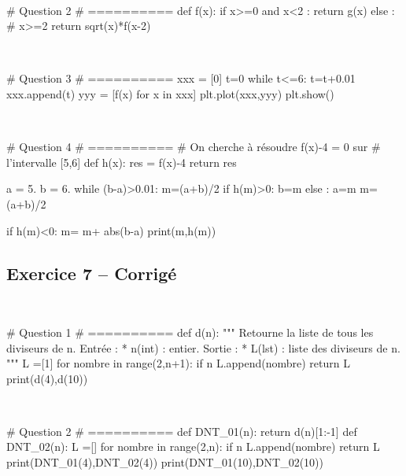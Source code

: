 \documentclass[10pt,fleqn]{article} %
\begin{document}
\begin{multicols}{2}
\begin{corrige}
$\quad$
\begin{python}
# Question 2
# ==========
def f(x):
    if x>=0 and x<2 :
        return g(x)
    else : # x>=2
        return sqrt(x)*f(x-2)
\end{python}
\end{corrige}

\begin{corrige}
$\quad$
\begin{python}
# Question 3
# ==========
xxx = [0]
t=0
while t<=6:
    t=t+0.01
    xxx.append(t)
yyy = [f(x) for x in xxx]
plt.plot(xxx,yyy)
plt.show()
\end{python}
\end{corrige}

\begin{corrige}
$\quad$
\begin{python}
# Question 4
# ==========
# On cherche à résoudre f(x)-4 = 0 sur
# l'intervalle [5,6]
def h(x):
    res = f(x)-4
    return res

a = 5.
b = 6.
while (b-a)>0.01:
    m=(a+b)/2
    if h(m)>0:
        b=m
    else :
        a=m
m=(a+b)/2

if h(m)<0:
    m= m+ abs(b-a)
print(m,h(m))
\end{python}
\end{corrige}

\newpage 

\subsection*{Exercice 7 -- Corrigé}

\begin{corrige}
$\quad$
\begin{python}
# Question 1 
# ==========
def d(n):
    """
    Retourne la liste de tous les diviseurs de n.
    Entrée : 
     * n(int) : entier.
    Sortie : 
     * L(lst) : liste des diviseurs de n.
    """
    L =[1]
    for nombre in range(2,n+1):
        if n%
            L.append(nombre)
    return L
print(d(4),d(10))
\end{python}
\end{corrige}

\begin{corrige}
$\quad$
\begin{python}
# Question 2 
# ==========
def DNT_01(n):
    return d(n)[1:-1]
def DNT_02(n):
    L =[]
    for nombre in range(2,n):
        if n%
            L.append(nombre)
    return L
print(DNT_01(4),DNT_02(4))
print(DNT_01(10),DNT_02(10))
\end{python}
\end{corrige}



\end{multicols}
\end{document}
